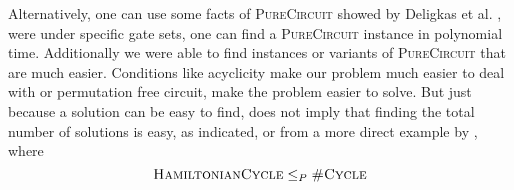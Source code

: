 Alternatively, one can use some facts of \textsc{PureCircuit} showed by Deligkas et al.
\cite{deligkas_PureCircuitTightInapproximability_2024}, were under specific 
gate sets, one can find a \textsc{PureCircuit} instance in polynomial time.
Additionally we were able to find instances or variants of \textsc{PureCircuit}
that are much easier. Conditions like acyclicity make our problem much easier to deal with
or permutation free circuit, make the problem easier to solve.
But just because a solution can be easy to find, does not imply that finding the total number of solutions
is easy, as \cite{valiant_ComplexityComputingPermanent_1979} indicated, or from a more direct
example by \cite{arora_ComputationalComplexityModern_2009}, where
$$
\textsc{HamiltonianCycle} \leq_P \textsc{\#Cycle}
$$





